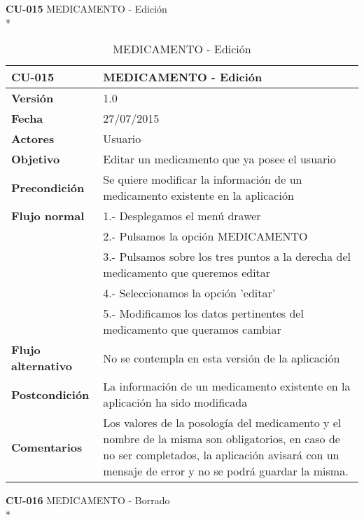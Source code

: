 \documentclass[../pfc.tex]{subfiles}
\begin{document}
		\textbf{CU-015}	MEDICAMENTO - Edición\\*
		
		\begin{table}[H]
			\centering
			\begin{tabular}[t]{|p{3cm}|p{9.5cm}|}
				\hline \textbf{CU-015} & \textbf{MEDICAMENTO - Edición} \\*
				\hline\hline \textbf{Versión} & 1.0 \\*
				\hline\hline \textbf{Fecha} & 27/07/2015 \\*
				\hline\textbf{Actores} 	& Usuario\\*
				\hline \textbf{Objetivo} & Editar un medicamento que ya posee el usuario\\* 			
				\hline \textbf{Precondición} & Se quiere modificar la información de un medicamento existente en la aplicación\\* 
				\hline \textbf{Flujo normal} & 1.- Desplegamos el menú drawer \\* 
				& 2.- Pulsamos la opción MEDICAMENTO\\*	
				& 3.- Pulsamos sobre los tres puntos a la derecha del medicamento que queremos editar\\*	
				& 4.- Seleccionamos la opción 'editar'\\*	
				& 5.- Modificamos los datos pertinentes del medicamento que queramos cambiar\\*	
				\hline \textbf{Flujo alternativo} & No se contempla en esta versión de la aplicación\\* 
				\hline \textbf{Postcondición} & La información de un medicamento existente en la aplicación ha sido modificada \\* 
				\hline \textbf{Comentarios}   & Los valores de la posología del medicamento y el nombre de la misma son obligatorios, en caso de no ser completados, la aplicación avisará con un mensaje de error y no se podrá guardar la misma.\\*
				\hline
			\end{tabular}
			\caption{MEDICAMENTO - Edición}
			\label{tabla:caso015}
		\end{table}
		
		\clearpage
		
		\textbf{CU-016}	MEDICAMENTO - Borrado\\*
		
\end{document}
